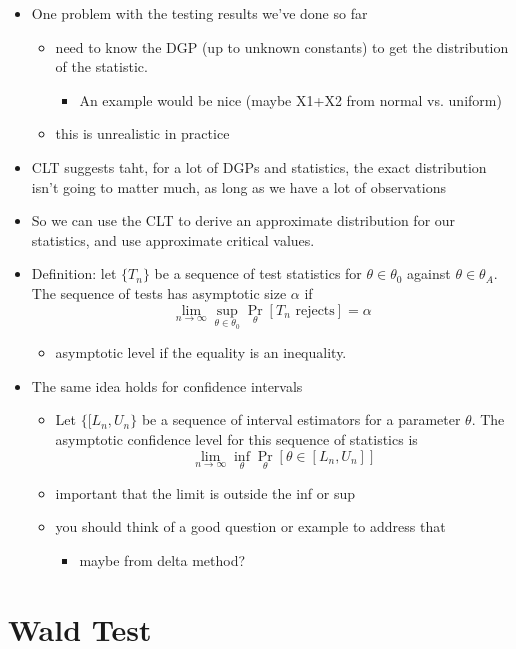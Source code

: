 \begin{itemize}
\item One problem with the testing results we've done so far
\begin{itemize}
\item need to know the DGP (up to unknown constants) to get the
        distribution of the statistic.
\begin{itemize}
\item An example would be nice (maybe X1+X2 from normal vs. uniform)
\end{itemize}
\item this is unrealistic in practice
\end{itemize}
\item CLT suggests taht, for a lot of DGPs and statistics, the exact
      distribution isn't going to matter much, as long as we have a
      lot of observations
\item So we can use the CLT to derive an approximate distribution for
      our statistics, and use approximate critical values.
    \item Definition: let $\{T_n\}$ be a sequence of test statistics
      for $θ ∈ θ_0$ against $θ ∈ θ_A$.  The sequence of tests has
      asymptotic size $α$ if
      \[\lim_{n → ∞} \sup_{θ ∈ θ_0} \Pr_θ[T_n \text{ rejects}] = α\]
\begin{itemize}
\item asymptotic level if the equality is an inequality.
\end{itemize}
\item The same idea holds for confidence intervals
\begin{itemize}
\item Let $\{[L_n, U_n\}$ be a sequence of interval estimators for a
        parameter $θ$.  The asymptotic confidence level for this
        sequence of statistics is
        \[\lim_{n → ∞} \inf_θ \Pr_{θ}[θ ∈ [L_n, U_n]]\]
\item important that the limit is outside the inf or sup
\item you should think of a good question or example to address that
\begin{itemize}
\item maybe from delta method?
\end{itemize}
\end{itemize}
\end{itemize}

\section{Wald Test}

